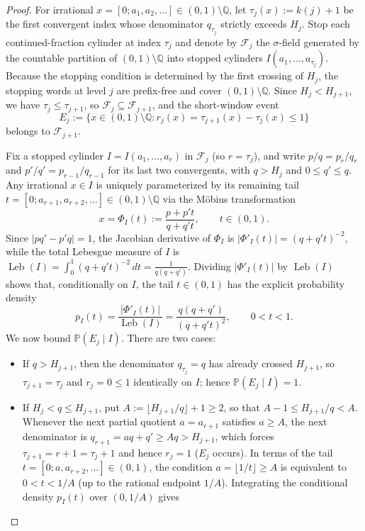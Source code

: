 \documentclass[11pt]{article}
\theoremstyle{definition}
\theoremstyle{remark}
\newcommand{\Q}{\mathbb{Q}}
\begin{document}
\begin{proof}
For irrational $x=[0;a_1,a_2,\dots]\in(0,1)\setminus\Q$, let
$\tau_j(x):=k(j)+1$ be the first convergent index whose denominator $q_{\tau_j}$
strictly exceeds $H_j$. Stop each continued-fraction cylinder at index $\tau_j$
and denote by $\mathcal F_j$ the $\sigma$-field generated by the countable
partition of $(0,1)\setminus\Q$ into stopped cylinders
$I(a_1,\dots,a_{\tau_j})$. Because the stopping condition is determined by the
first crossing of $H_j$, the stopping words at level $j$ are prefix-free and cover
$(0,1)\setminus\Q$. Since $H_j<H_{j+1}$, we have $\tau_j\le\tau_{j+1}$, so
$\mathcal F_j\subseteq\mathcal F_{j+1}$, and the short-window event
\[
E_j:=\bigl\{x\in(0,1)\setminus\Q:r_j(x)=\tau_{j+1}(x)-\tau_j(x)\le1\bigr\}
\]
belongs to $\mathcal F_{j+1}$.

Fix a stopped cylinder $I=I(a_1,\dots,a_r)$ in $\mathcal F_j$ (so $r=\tau_j$),
and write $p/q=p_r/q_r$ and $p'/q'=p_{r-1}/q_{r-1}$ for its last two
convergents, with $q>H_j$ and $0\le q'\le q$. Any irrational $x\in I$ is
uniquely parameterized by its remaining tail $t=[0;a_{r+1},a_{r+2},\dots]\in(0,1)\setminus\Q$
via the M\"obius transformation
\[
x=\Phi_I(t):=\frac{p+p't}{q+q't},\qquad t\in(0,1).
\]
Since $|pq'-p'q|=1$, the Jacobian derivative of $\Phi_I$ is
$|\Phi'_I(t)|=(q+q't)^{-2}$, while the total Lebesgue measure of $I$ is
$\operatorname{Leb}(I)=\int_0^1(q+q't)^{-2}\,dt=\frac{1}{q(q+q')}$. Dividing
$|\Phi'_I(t)|$ by $\operatorname{Leb}(I)$ shows that, conditionally on $I$, the
tail $t\in(0,1)$ has the explicit probability density
\[
p_I(t)=\frac{|\Phi'_I(t)|}{\operatorname{Leb}(I)}=\frac{q(q+q')}{(q+q't)^2},
\qquad 0<t<1.
\]
We now bound $\mathbb P(E_j\mid I)$. There are two cases:
\begin{itemize}[leftmargin=1.8em]
\item If $q>H_{j+1}$, then the denominator $q_{\tau_j}=q$ has already crossed
$H_{j+1}$, so $\tau_{j+1}=\tau_j$ and $r_j=0\le1$ identically on $I$; hence
$\mathbb P(E_j\mid I)=1$.
\item If $H_j<q\le H_{j+1}$, put $A:=\lfloor H_{j+1}/q\rfloor+1\ge2$, so that
$A-1\le H_{j+1}/q<A$. Whenever the next partial quotient $a=a_{r+1}$ satisfies
$a\ge A$, the next denominator is $q_{r+1}=aq+q'\ge Aq>H_{j+1}$, which forces
$\tau_{j+1}=r+1=\tau_j+1$ and hence $r_j=1$ ($E_j$ occurs). In terms of the tail
$t=[0;a,a_{r+2},\dots]\in(0,1)$, the condition $a=\lfloor 1/t\rfloor\ge A$ is
equivalent to $0<t<1/A$ (up to the rational endpoint $1/A$). Integrating the
conditional density $p_I(t)$ over $(0,1/A)$ gives

\end{itemize}
\end{proof}
\end{document}
